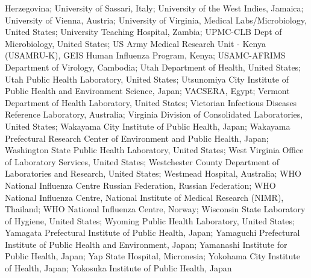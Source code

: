 \documentclass[9pt,lineno]{elife} %
\providecommand{\DIFaddbegin}{} %
\providecommand{\DIFaddbegin}{} %
\newcommand{\DIFaddincludegraphics}[2][]{{\color{blue}\fbox{\DIFOincludegraphics[#1]{#2}}}} %
\DeclareRobustCommand{\DIFaddbegin}{\DIFOaddbegin \let\includegraphics\DIFaddincludegraphics} %
\begin{document}
\begin{appendixbox}
Herzegovina; University of Sassari, Italy; University of the West Indies, Jamaica; University of Vienna, Austria; University of Virginia, Medical Labs/Microbiology, United States; University Teaching Hospital, Zambia; UPMC-CLB Dept of Microbiology, United States; US Army Medical Research Unit - Kenya (USAMRU-K), GEIS Human Influenza Program, Kenya; USAMC-AFRIMS Department of Virology, Cambodia; Utah Department of Health, United States; Utah Public Health Laboratory, United States; Utsunomiya City Institute of Public Health and Environment Science, Japan; VACSERA, Egypt; Vermont Department of Health Laboratory, United States; Victorian Infectious Diseases Reference Laboratory, Australia; Virginia Division of Consolidated Laboratories, United States; Wakayama City Institute of Public Health, Japan; Wakayama Prefectural Research Center of Environment and Public Health, Japan; Washington State Public Health Laboratory, United States; West Virginia Office of Laboratory Services, United States; Westchester County Department of Laboratories and Research, United States; Westmead Hospital, Australia; WHO National Influenza Centre Russian Federation, Russian Federation; WHO National Influenza Centre, National Institute of Medical Research (NIMR), Thailand; WHO National Influenza Centre, Norway; Wisconsin State Laboratory of Hygiene, United States; Wyoming Public Health Laboratory, United States; Yamagata Prefectural Institute of Public Health, Japan; Yamaguchi Prefectural Institute of Public Health and Environment, Japan; Yamanashi Institute for Public Health, Japan; Yap State Hospital, Micronesia; Yokohama City Institute of Health, Japan; Yokosuka Institute of Public Health, Japan
\DIFaddbegin 

\end{appendixbox}


\clearpage
\end{document}
